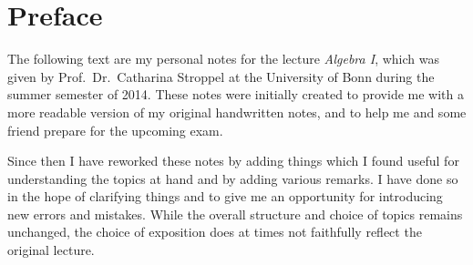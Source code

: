 \chapter*{Preface}

The following text are my personal notes for the lecture \emph{Algebra I}, which was given by Prof.\ Dr.\ Catharina Stroppel at the University of Bonn during the summer semester of 2014.
These notes were initially created to provide me with a more readable version of my original handwritten notes, and to help me and some friend prepare for the upcoming exam.

Since then I have reworked these notes by adding things which I found useful for understanding the topics at hand and by adding various remarks.
I have done so in the hope of clarifying things and to give me an opportunity for introducing new errors and mistakes.
While the overall structure and choice of topics remains unchanged, the choice of exposition does at times not faithfully reflect the original lecture.




